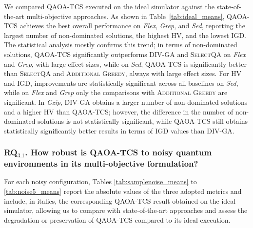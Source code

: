 We compared \textsc{QAOA-TCS} executed on the ideal simulator against the state-of-the-art multi-objective approaches. As shown in Table~\ref{tab:ideal_means}, \textsc{QAOA-TCS} achieves the best overall performance on \textit{Flex}, \textit{Grep}, and \textit{Sed}, reporting the largest number of non-dominated solutions, the highest HV, and the lowest IGD. The statistical analysis mostly confirms this trend; in terms of non-dominated solutions, \textsc{QAOA-TCS} significantly outperforms \textsc{DIV-GA} and \textsc{SelectQA} on \textit{Flex} and \textit{Grep}, with large effect sizes, while on \textit{Sed}, \textsc{QAOA-TCS} is significantly better than \textsc{SelectQA} and \textsc{Additional Greedy}, always with large effect sizes. For HV and IGD, improvements are statistically significant across all baselines on \textit {Sed}, while on \textit{Flex} and \textit{Grep} only the comparisons with \textsc{Additional Greedy} are significant. In \textit{Gzip}, \textsc{DIV-GA} obtains a larger number of non-dominated solutions and a higher HV than \textsc{QAOA-TCS}; however, the difference in the number of non-dominated solutions is not statistically significant, while \textsc{QAOA-TCS} still obtains statistically significantly better results in terms of IGD values than \textsc{DIV-GA}.


\subsubsection{RQ$_{3.1}$. How robust is QAOA-TCS to noisy quantum environments in its multi-objective formulation?}

For each noisy configuration, Tables \ref{tab:samplenoise_means} to \ref{tab:noise5_means} report the absolute values of the three adopted metrics and include, in italics, the corresponding \textsc{QAOA-TCS} result obtained on the ideal simulator, allowing us to compare with state-of-the-art approaches and assess the degradation or preservation of \textsc{QAOA-TCS} compared to its ideal execution.


